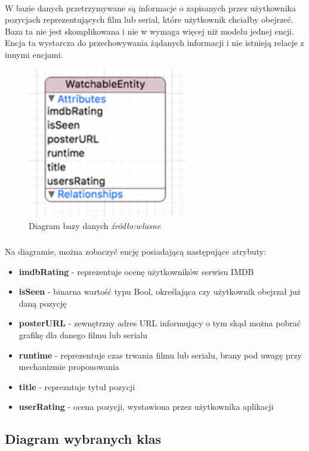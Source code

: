 \documentclass[12pt,oneside,a4paper]{report}
\begin{document}
\paragraph{}W bazie danych przetrzymywane są informacje o zapisanych przez użytkownika pozycjach reprezentujących film lub serial, które użytkownik chciałby obejrzeć. Baza ta nie jest skomplikowana i nie w wymaga więcej niż modelu jednej encji. Encja ta wystarcza do przechowywania żądanych informacji i nie istnieją relacje z innymi encjami.
\begin{figure}[ht!]
	\centering
	\includegraphics[width=7cm]{watchableEntity}
	\caption{Diagram bazy danych 
		\textit{źródło:własne }}
	\label{watchableEntity}
\end{figure}
\subparagraph{}Na diagramie, można zobaczyć encję posiadającą następujące atrybuty:
\begin{itemize}
	\item \textbf{imdbRating} - reprezentuje ocenę użytkowników serwisu IMDB
	\item \textbf{isSeen} - binarna wartość typu Bool, określająca czy użytkownik obejrzał już daną pozycję  
	\item \textbf{posterURL} - zewnętrzny adres URL informujący o tym skąd można pobrać grafikę dla danego filmu lub serialu
	\item \textbf{runtime} - reprezentuje czas trwania filmu lub serialu, brany pod uwagę przy mechanizmie proponowania
	\item \textbf{title} - reprezntuje tytuł pozycji
	\item \textbf{userRating} - ocena pozycji, wystawiona przez użytkownika aplikacji 
\end{itemize}
\subsection{Diagram wybranych klas}
\end{document}
